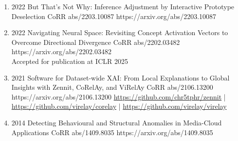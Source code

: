 {\begin{enumerate}
        \item {}
                        {2022}
                        {But That's Not Why: Inference Adjustment by Interactive Prototype Deselection}
                        {CoRR abs/2203.10087}
                        {https://arxiv.org/abs/2203.10087}

        \item {}
                        {2022}
                        {Navigating Neural Space: Revisiting Concept Activation Vectors to Overcome Directional Divergence}
                        {CoRR abs/2202.03482}
                        {https://arxiv.org/abs/2202.03482}
                        {\\ Accepted for publication at ICLR 2025}

        \item {}
                        {2021}
                        {Software for Dataset-wide XAI: From Local Explanations to Global Insights with Zennit, CoRelAy, and ViRelAy}
                        {CoRR abs/2106.13200}
                        {https://arxiv.org/abs/2106.13200}
                        {   \href{https://github.com/chr5tphr/zennit}{https://github.com/chr5tphr/zennit} | \\
                            \href{https://github.com/virelay/corelay}{https://github.com/virelay/corelay} |
                            \href{https://github.com/virelay/virelay}{https://github.com/virelay/virelay}
                        }

        \item {}
                        {2014}
                        {Detecting Behavioural and Structural Anomalies in Media-Cloud Applications}
                        {CoRR abs/1409.8035}
                        {https://arxiv.org/abs/1409.8035}

    \end{enumerate}

}
